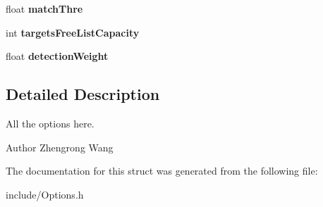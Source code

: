 \begin{DoxyCompactItemize}
\item 
\hypertarget{structOptions_abf189d7ae3c26b01ee4cd45c8ff725fa}{}float {\bfseries match\+Thre}\label{structOptions_abf189d7ae3c26b01ee4cd45c8ff725fa}

\item 
\hypertarget{structOptions_a289959230f28e7dd539dabd153c140c2}{}int {\bfseries targets\+Free\+List\+Capacity}\label{structOptions_a289959230f28e7dd539dabd153c140c2}

\item 
\hypertarget{structOptions_a87453b1a266c31e2ab74a4e25b8cf7cc}{}float {\bfseries detection\+Weight}\label{structOptions_a87453b1a266c31e2ab74a4e25b8cf7cc}

\end{DoxyCompactItemize}


\subsection{Detailed Description}
All the options here.

\begin{DoxyAuthor}{Author}
Zhengrong Wang 
\end{DoxyAuthor}


The documentation for this struct was generated from the following file\+:\begin{DoxyCompactItemize}
\item 
include/Options.\+h\end{DoxyCompactItemize}
